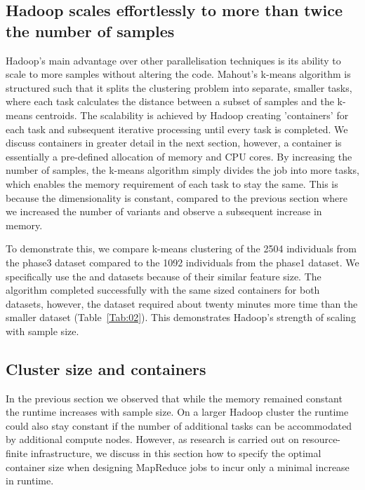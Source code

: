 \documentclass{bioinfo}
\begin{document}
\subsection*{Hadoop scales effortlessly to more than twice the number of samples}
Hadoop's main advantage over other parallelisation techniques is its ability to scale to more samples without altering the code. 
Mahout's k-means algorithm is structured such that it splits the clustering problem into separate, smaller tasks, where each task calculates the distance between a subset of samples and the k-means centroids. 
The scalability is achieved by Hadoop creating 'containers' for each task and subsequent iterative processing until every task is completed.
We discuss containers in greater detail in the next section, however, a container is essentially a pre-defined allocation of memory and CPU cores.
By increasing the number of samples, the k-means algorithm simply divides the job into more tasks, which enables the memory requirement of each task to stay the same.
This is because the dimensionality is constant, compared to the previous section where we increased the number of variants and observe a subsequent increase in memory. 

To demonstrate this, we compare k-means clustering of the 2504 individuals from the phase3 dataset compared to the 1092 individuals from the phase1 dataset.
We specifically use the \SevenPhaseone{} and \ThreePhasethree{} datasets because of their similar feature size.
The algorithm completed successfully with the same sized containers for both datasets, however, the \ThreePhasethree{} dataset required about twenty minutes more time than the smaller \SevenPhaseone{} dataset (Table~\ref{Tab:02}). 
This demonstrates Hadoop's strength of scaling with sample size. 


\subsection*{Cluster size and containers}
In the previous section we observed that while the memory remained constant the runtime increases with sample size. 
On a larger Hadoop cluster the runtime could also stay constant if the number of additional tasks can be accommodated by additional compute nodes. 
However, as research is carried out on resource-finite infrastructure, we discuss in this section how to specify the optimal container size when designing MapReduce jobs to incur only a minimal increase in runtime. 
\end{document}
